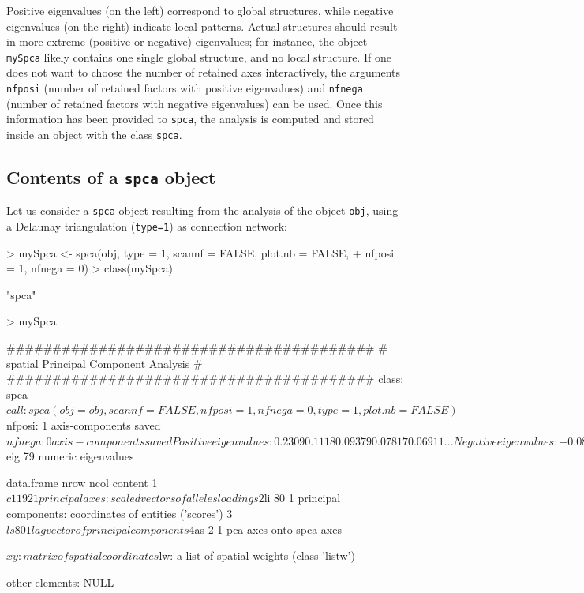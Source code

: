 \documentclass{article}
\begin{document}
\noindent Positive eigenvalues (on the left) correspond to global
structures, while negative eigenvalues (on the right) indicate local patterns.
Actual structures should result in more extreme (positive or
negative) eigenvalues; for instance, the object \texttt{mySpca} likely
contains one single global structure, and no local structure.
If one does not want to choose the number of retained axes
interactively, the arguments \texttt{nfposi} (number of retained
factors with positive eigenvalues) and \texttt{nfnega} (number of
retained factors with negative eigenvalues) can be used.
Once this information has been provided to \texttt{spca}, the
analysis is computed and stored inside an object with the class \texttt{spca}.





\subsection{Contents of a \texttt{spca} object}
Let us consider a \texttt{spca} object resulting from the analysis of
the object \texttt{obj}, using a Delaunay triangulation (\texttt{type=1}) as connection network:
\begin{Schunk}
\begin{Sinput}
> mySpca <- spca(obj, type = 1, scannf = FALSE, plot.nb = FALSE, 
+     nfposi = 1, nfnega = 0)
> class(mySpca)
\end{Sinput}
\begin{Soutput}
[1] "spca"
\end{Soutput}
\begin{Sinput}
> mySpca
\end{Sinput}
\begin{Soutput}
	########################################
	# spatial Principal Component Analysis #
	########################################
class: spca
$call: spca(obj = obj, scannf = FALSE, nfposi = 1, nfnega = 0, type = 1, 
    plot.nb = FALSE)

$nfposi: 1 axis-components saved
$nfnega: 0 axis-components saved
Positive eigenvalues: 0.2309 0.1118 0.09379 0.07817 0.06911 ...
Negative eigenvalues: -0.08421 -0.07376 -0.06978 -0.06648 -0.06279 ...

  vector length mode    content    
1 $eig   79     numeric eigenvalues

  data.frame nrow ncol content                                                 
1 $c1        192  1    principal axes: scaled vectors of alleles loadings      
2 $li        80   1    principal components: coordinates of entities ('scores')
3 $ls        80   1    lag vector of principal components                      
4 $as        2    1    pca axes onto spca axes                                 

$xy: matrix of spatial coordinates
$lw: a list of spatial weights (class 'listw')

other elements: NULL
\end{Soutput}
\end{Schunk}
\end{document}
